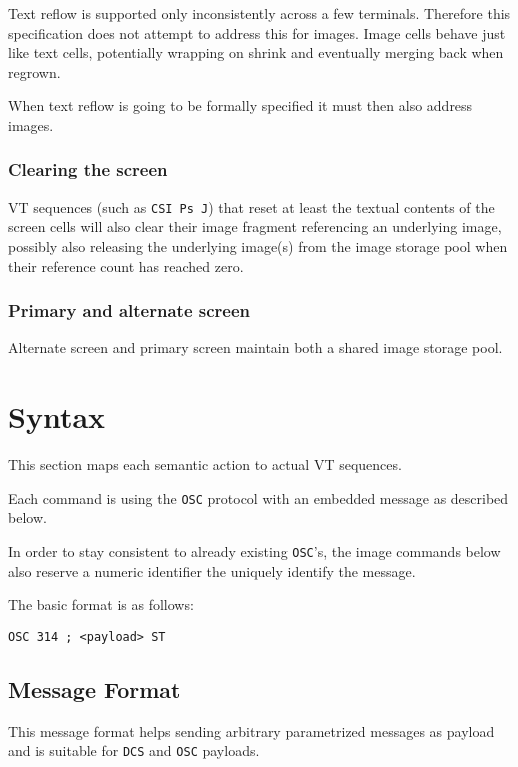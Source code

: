 \documentclass[a4paper]{article}
\newcommand{\code}[1]{\colorbox{light-gray}{\texttt{#1}}}
\begin{document}
Text reflow is supported only inconsistently across a few terminals.
Therefore this specification does not attempt to address this for images.
Image cells behave just like text cells, potentially wrapping on shrink
and eventually merging back when regrown.

When text reflow is going to be formally specified it must then also address images.

\subsubsection*{Clearing the screen}

VT sequences (such as \code{CSI Ps J}) that reset at least the textual contents
of the screen cells will also clear their image fragment referencing an underlying image,
possibly also releasing the underlying image(s) from the image storage pool
when their reference count has reached zero.

\subsubsection*{Primary and alternate screen}

Alternate screen and primary screen maintain both a shared image storage pool.


\section{Syntax} %

This section maps each semantic action to actual VT sequences.

Each command is using the \code{OSC} protocol with an embedded message as
described below.

In order to stay consistent to already existing \code{OSC}'s,
the image commands below also reserve a numeric identifier the uniquely
identify the message.

The basic format is as follows:

\code{OSC 314 ; <payload> ST}


\subsection{Message Format} %

This message format helps sending arbitrary parametrized messages
as payload and is suitable for \code{DCS} and \code{OSC} payloads.
\end{document}

